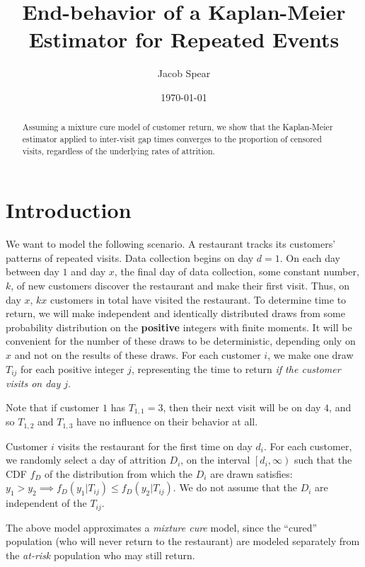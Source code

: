 \documentclass[11pt]{article}
\title{End-behavior of a Kaplan-Meier Estimator for Repeated Events}
\author{Jacob Spear}
\date{\today}
\theoremstyle{definition}
\begin{document}
\maketitle

\begin{abstract}
Assuming a mixture cure model of customer return, we show that the Kaplan-Meier estimator applied to inter-visit
gap times converges to the proportion of censored visits, regardless of the underlying rates of attrition.
\end{abstract}

\section{Introduction}

We want to model the following scenario.  A restaurant tracks its customers' patterns of repeated visits.
Data collection begins on day $d=1$.  On each day between day $1$ and day $x$, the final day of data collection,
some constant number, $k$, of new customers discover the restaurant and make their first visit.  Thus, on day $x$,
$kx$ customers in total have visited the restaurant.  To determine time to return, we will make independent and 
identically distributed draws from some probability distribution on the \textbf{positive} integers with finite moments.  It will be convenient for the number of these draws to be deterministic, depending only on $x$ and not on the results
of these draws.  For each customer $i$, we make one draw $T_{ij}$ for each positive integer $j$, representing the time 
to return \textit{if the customer visits on day $j$}.  

Note that if customer $1$ has $T_{1,1}=3$, then their next visit will be on day $4$, and so $T_{1,2}$ and $T_{1,3}$
have no influence on their behavior at all.  

Customer $i$ visits the restaurant for the first time on day $d_i$.  For each customer, we randomly select 
a day of attrition $D_i$, on the interval $\left[d_i,\infty\right)$ such that the CDF $f_D$ of the distribution from which 
the $D_i$ are drawn satisfies:
$y_1>y_2 \implies f_{D}(y_1|T_{ij}) \leq f_{D}(y_2|T_{ij})$.
We do not assume that the $D_i$ are independent of the $T_{ij}$.  

The above model approximates a \textit{mixture cure} model, since the ``cured'' population (who will never return to the restaurant)
are modeled separately from the \textit{at-risk} population who may still return. 
\end{document}
